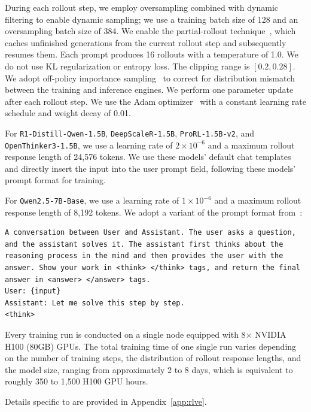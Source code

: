 \documentclass{article}
\theoremstyle{plain}
\theoremstyle{definition}
\theoremstyle{remark}
\begin{document}
During each rollout step, we employ oversampling combined with dynamic filtering to enable dynamic sampling;
we use a training batch size of 128 and an oversampling batch size of 384.
We enable the partial-rollout technique~\citep{kimi1.5,glm-4.5,zhou2025april}, which caches unfinished generations from the current rollout step and subsequently resumes them.
Each prompt produces 16 rollouts with a temperature of 1.0.
We do not use KL regularization or entropy loss.
The clipping range is $[0.2, 0.28]$.
We adopt off-policy importance sampling~\citep{yao2025tis} to correct for distribution mismatch between the training and inference engines.
We perform one parameter update after each rollout step.
We use the Adam optimizer~\citep{kingma2015adam} with a constant learning rate schedule and weight decay of 0.01.

For \texttt{R1-Distill-Qwen-1.5B}, \texttt{DeepScaleR-1.5B}, \texttt{ProRL-1.5B-v2}, and \texttt{OpenThinker3-1.5B}, we use a learning rate of $2\times10^{-6}$ and a maximum rollout response length of 24,576 tokens.
We use these models’ default chat templates and directly insert the input into the user prompt field, following these models' prompt format for training.

For \texttt{Qwen2.5-7B-Base}, we use a learning rate of $1\times10^{-6}$ and a maximum rollout response length of 8,192 tokens.
We adopt a variant of the prompt format from~\citet{deepseek-r1,pan2025tinyzero}:
\begin{lstlisting}[language={},caption={},label={lst:qwen25-template}]
A conversation between User and Assistant. The user asks a question, and the assistant solves it. The assistant first thinks about the reasoning process in the mind and then provides the user with the answer. Show your work in <think> </think> tags, and return the final answer in <answer> </answer> tags.
User: {input}
Assistant: Let me solve this step by step.
<think>
\end{lstlisting}

Every training run is conducted on a single node equipped with 8$\times$ NVIDIA H100 (80GB) GPUs. 
The total training time of one single run varies depending on the number of training steps, the distribution of rollout response lengths, and the model size, ranging from approximately 2 to 8 days, which is equivalent to roughly 350 to 1{,}500 H100 GPU hours.

Details specific to \ours{} are provided in Appendix~\ref{app:rlve}.
\end{document}
